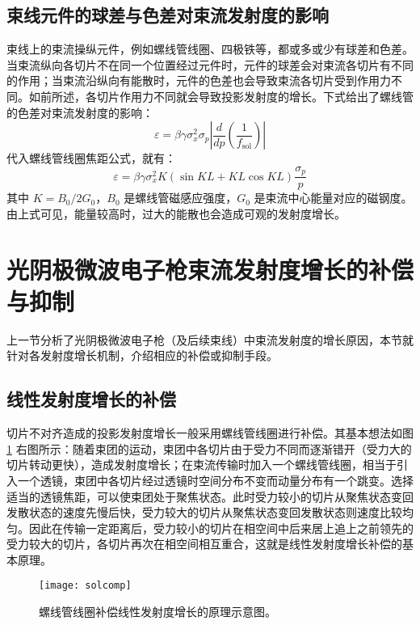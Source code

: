 
\subsection{束线元件的球差与色差对束流发射度的影响}
束线上的束流操纵元件，例如螺线管线圈、四极铁等，都或多或少有球差和色差。当束流纵向各切片不在同一个位置经过元件时，元件的球差会对束流各切片有不同的作用；当束流沿纵向有能散时，元件的色差也会导致束流各切片受到作用力不同。如前所述，各切片作用力不同就会导致投影发射度的增长。下式给出了螺线管的色差对束流发射度的影响\cite{Dowell:2010ab}：
\begin{equation}
\varepsilon = \beta\gamma\sigma_x^2\sigma_p\left|\frac{d}{dp}\left(\frac{1}{f_{\text{sol}}}\right)\right|
\end{equation}
代入螺线管线圈焦距公式，就有：
\begin{equation}
\varepsilon = \beta\gamma\sigma_x^2K(\sin KL+KL\cos KL)\frac{\sigma_p}{p}
\end{equation}
其中 $K = B_0/2G_0$，$B_0$ 是螺线管磁感应强度，$G_0$ 是束流中心能量对应的磁钢度。由上式可见，能量较高时，过大的能散也会造成可观的发射度增长。

\section{光阴极微波电子枪束流发射度增长的补偿与抑制}
上一节分析了光阴极微波电子枪（及后续束线）中束流发射度的增长原因，本节就针对各发射度增长机制，介绍相应的补偿或抑制手段。

\subsection{线性发射度增长的补偿}
切片不对齐造成的投影发射度增长一般采用螺线管线圈进行补偿。其基本想法如图 \ref{fig:solcomp} 右图所示：随着束团的运动，束团中各切片由于受力不同而逐渐错开（受力大的切片转动更快），造成发射度增长；在束流传输时加入一个螺线管线圈，相当于引入一个透镜，束团中各切片经过透镜时空间分布不变而动量分布有一个跳变。选择适当的透镜焦距，可以使束团处于聚焦状态。此时受力较小的切片从聚焦状态变回发散状态的速度先慢后快，受力较大的切片从聚焦状态变回发散状态则速度比较均匀。因此在传输一定距离后，受力较小的切片在相空间中后来居上追上之前领先的受力较大的切片，各切片再次在相空间相互重合，这就是线性发射度增长补偿的基本原理\cite{Anderson:2002ab}。
\begin{figure}[htbp]
\centering
\texttt{[image: solcomp]}
\caption{\label{fig:solcomp} 螺线管线圈补偿线性发射度增长的原理示意图\cite{Anderson:2002ab}。}
\end{figure}

